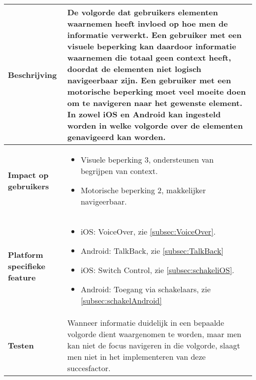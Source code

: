 \begin{table}[H]
\begin{tabular}{|l|p{12cm}|}
        \hline
        
        \textbf{Beschrijving}                 & De volgorde dat gebruikers elementen waarnemen heeft invloed op hoe men de informatie verwerkt. Een gebruiker met een visuele beperking kan daardoor informatie waarnemen die totaal geen context heeft, doordat de elementen niet logisch navigeerbaar zijn. Een gebruiker met een motorische beperking moet veel moeite doen om te navigeren naar het gewenste element. In zowel iOS en Android kan ingesteld worden in welke volgorde over de elementen genavigeerd kan worden.\\ 
        \hline
        \textbf{Impact op gebruikers}         &  
        \begin{itemize}
            \item Visuele beperking 3, ondersteunen van begrijpen van context.
            \item Motorische beperking 2, makkelijker navigeerbaar.
        \end{itemize}                                                                                                                                                                                                                                                                                                                                                                                                                    \\ 
    \hline
    \textbf{Platform specifieke feature} & \begin{itemize}
        \item iOS: VoiceOver, zie \ref{subsec:VoiceOver}.
        \item Android: TalkBack, zie \ref{subsec:TalkBack}
            \item iOS: Switch Control, zie \ref{subsec:schakeliOS}.
        \item Android: Toegang via schakelaars, zie \ref{subsec:schakelAndroid}
    \end{itemize}                                                                                                                                                                       \\ 
        \hline
        \textbf{Testen}                       & Wanneer informatie duidelijk in een bepaalde volgorde dient waargenomen te worden, maar men kan niet de focus navigeren in die volgorde, slaagt men niet in het implementeren van deze succesfactor.                                                                                                                                                                                \\
        \hline
    \end{tabular}
    
\end{table}

